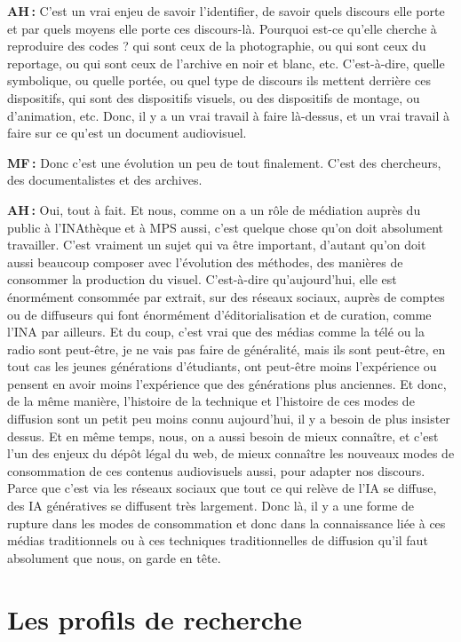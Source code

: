 \textbf{AH :} C'est un vrai enjeu de savoir l'identifier, de savoir quels discours elle porte et par quels moyens elle porte ces discours-là.  Pourquoi est-ce qu'elle cherche à reproduire des codes ? qui sont ceux de la photographie, ou qui sont ceux du reportage, ou qui sont ceux de l'archive en noir et blanc, etc. C'est-à-dire, quelle symbolique, ou quelle portée, ou quel type de discours ils mettent derrière ces dispositifs, qui sont des dispositifs visuels, ou des dispositifs de montage, ou d'animation, etc. Donc, il y a un vrai travail à faire là-dessus, et un vrai travail à faire sur ce qu'est un document audiovisuel. 

\textbf{MF :} Donc c'est une évolution un peu de tout finalement. C'est des chercheurs, des documentalistes et des archives. 

\textbf{AH :} Oui, tout à fait.  Et nous, comme on a un rôle de médiation auprès du public à l’INAthèque et à MPS aussi, c'est quelque chose qu'on doit absolument travailler. C'est vraiment un sujet qui va être important, d'autant qu'on doit aussi beaucoup composer avec l'évolution des méthodes, des manières de consommer la production du visuel. C'est-à-dire qu'aujourd'hui, elle est énormément consommée par extrait, sur des réseaux sociaux, auprès de comptes ou de diffuseurs qui font énormément d'éditorialisation et de curation, comme l’INA par ailleurs.  Et du coup, c'est vrai que des médias comme la télé ou la radio sont peut-être, je ne vais pas faire de généralité, mais ils sont peut-être, en tout cas les jeunes générations d'étudiants, ont peut-être moins l'expérience ou pensent en avoir moins l'expérience que des générations plus anciennes.  Et donc, de la même manière, l'histoire de la technique et l'histoire de ces modes de diffusion sont un petit peu moins connu aujourd'hui, il y a besoin de plus insister dessus.  Et en même temps, nous, on a aussi besoin de mieux connaître, et c'est l'un des enjeux du dépôt légal du web, de mieux connaître les nouveaux modes de consommation de ces contenus audiovisuels aussi, pour adapter nos discours. Parce que c'est via les réseaux sociaux que tout ce qui relève de l'IA se diffuse, des IA génératives se diffusent très largement. Donc là, il y a une forme de rupture dans les modes de consommation et donc dans la connaissance liée à ces médias traditionnels ou à ces techniques traditionnelles de diffusion qu'il faut absolument que nous, on garde en tête.

\section*{Les profils de recherche }


